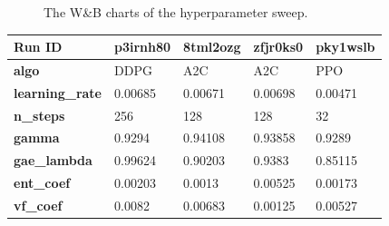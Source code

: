 \documentclass[../xlapes02]{subfiles}
\begin{document}
\begin{figure}
        \caption{The W\&B charts of the hyperparameter sweep.}
        \label{fig:wb-charts}
    \end{figure}

    \begin{table}[h!]
        \centering
        {\footnotesize
            \begin{tabular}{|l||l|l||l|l|}
                \hline
                \textbf{Run ID}                    & p3irnh80                                     & 8tml2ozg                                     & zfjr0ks0                                     & pky1wslb                                     \\ \hline
                \textbf{algo}                      & DDPG                                         & A2C                                          & A2C                                          & PPO                                          \\ \hline
                \textbf{learning\_rate}            & 0.00685                                      & 0.00671                                      & 0.00698                                      & 0.00471                                      \\ \hline
                \textbf{n\_steps}                  & 256                                          & 128                                          & 128                                          & 32                                           \\ \hline
                \textbf{gamma}                     & 0.9294                                       & 0.94108                                      & 0.93858                                      & 0.9289                                       \\ \hline
                \textbf{gae\_lambda}               & 0.99624                                      & 0.90203                                      & 0.9383                                       & 0.85115                                      \\ \hline
                \textbf{ent\_coef}                 & 0.00203                                      & 0.0013                                       & 0.00525                                      & 0.00173                                      \\ \hline
                \textbf{vf\_coef}                  & 0.0082                                       & 0.00683                                      & 0.00125                                      & 0.00527                                      \\ \hline

\end{tabular}}
\end{table}
\end{document}
